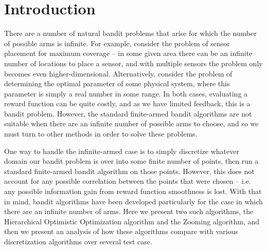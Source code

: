\section{Introduction}
There are a number of natural bandit problems that arise for which the
number of possible arms is infinite.  For example, consider the problem of
sensor placement for maximum coverage -- in some given area there can be an
infinite number of locations to place a sensor, and with multiple sensors the
problem only becomes even higher-dimensional.  Alternatively, consider the
problem of determining the optimal parameter of some physical system, where
this parameter is simply a real number in some range.  In both cases,
evaluating a reward function can be quite costly, and as we have limited
feedback, this is a bandit problem.  However, the standard finite-armed
bandit algorithms are not suitable when there are an infinite number of
possible arms to choose, and so we must turn to other methods in order to
solve these problems.

One way to handle the infinite-armed
case is to simply discretize whatever domain our bandit problem is over
into some finite number of points, then run a standard finite-armed bandit
algorithm on those points.  However, this does not account for any
possible correlation between the points that were chosen -- i.e. any possible
information gain from reward function smoothness is lost.  With that in
mind, bandit algorithms have been developed particularly for the case in
which there are an infinite number of arms.  Here we present two such
algorithms, the Hierarchical Optimistic Optimization algorithm and the
Zooming algorithm, and then we present an analysis of how these algorithms
compare with various discretization algorithms over several test case.
